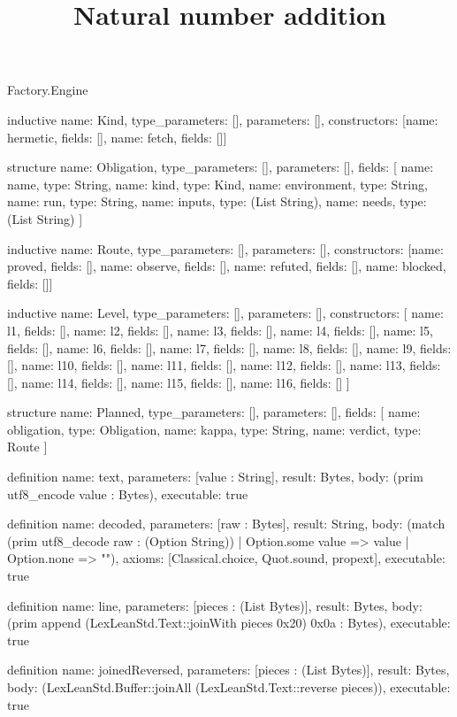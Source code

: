 \begin{lexlean}{Factory.Engine}
\title{Natural number addition}
\begin{semanticmodule}
inductive{
  name: Kind,
  type_parameters: [],
  parameters: [],
  constructors: [{name: hermetic, fields: []}, {name: fetch, fields: []}]
}

structure{
  name: Obligation,
  type_parameters: [],
  parameters: [],
  fields: [
    {name: name, type: String},
    {name: kind, type: Kind},
    {name: environment, type: String},
    {name: run, type: String},
    {name: inputs, type: (List String)},
    {name: needs, type: (List String)}
  ]
}

inductive{
  name: Route,
  type_parameters: [],
  parameters: [],
  constructors: [{name: proved, fields: []}, {name: observe, fields: []}, {name: refuted, fields: []}, {name: blocked, fields: []}]
}

inductive{
  name: Level,
  type_parameters: [],
  parameters: [],
  constructors: [
    {name: l1, fields: []},
    {name: l2, fields: []},
    {name: l3, fields: []},
    {name: l4, fields: []},
    {name: l5, fields: []},
    {name: l6, fields: []},
    {name: l7, fields: []},
    {name: l8, fields: []},
    {name: l9, fields: []},
    {name: l10, fields: []},
    {name: l11, fields: []},
    {name: l12, fields: []},
    {name: l13, fields: []},
    {name: l14, fields: []},
    {name: l15, fields: []},
    {name: l16, fields: []}
  ]
}

structure{
  name: Planned,
  type_parameters: [],
  parameters: [],
  fields: [
    {name: obligation, type: Obligation},
    {name: kappa, type: String},
    {name: verdict, type: Route}
  ]
}

definition{
  name: text,
  parameters: [value : String],
  result: Bytes,
  body: (prim utf8_encode value : Bytes),
  executable: true
}

definition{
  name: decoded,
  parameters: [raw : Bytes],
  result: String,
  body: (match (prim utf8_decode raw : (Option String))
    | Option.some value => value
    | Option.none => ""),
  axioms: [Classical.choice, Quot.sound, propext],
  executable: true
}

definition{
  name: line,
  parameters: [pieces : (List Bytes)],
  result: Bytes,
  body: (prim append (LexLeanStd.Text::joinWith pieces 0x20) 0x0a : Bytes),
  executable: true
}

definition{
  name: joinedReversed,
  parameters: [pieces : (List Bytes)],
  result: Bytes,
  body: (LexLeanStd.Buffer::joinAll (LexLeanStd.Text::reverse pieces)),
  executable: true
}


\end{semanticmodule}
\end{lexlean}
